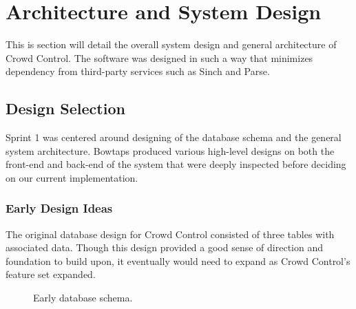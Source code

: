  \section{Architecture and System Design}
 This is section will detail the overall system design and general architecture of Crowd Control. The software was designed in such a way that minimizes dependency from third-party services such as Sinch and Parse.
 
 \subsection{Design Selection}
Sprint 1 was centered around designing of the database schema and the general system architecture. Bowtaps produced various high-level designs on both the front-end and back-end of the system that were deeply inspected before deciding on our current implementation.

\subsubsection{Early Design Ideas}
The original database design for Crowd Control consisted of three tables with associated data. Though this design provided a good sense of direction and foundation to build upon, it eventually would need to expand as Crowd Control's feature set expanded.

	\begin{figure}[tbh]
	\begin{center}
	\end{center}
	\caption{Early database schema. \label{EarlyDBSchema}}
	\end{figure}

